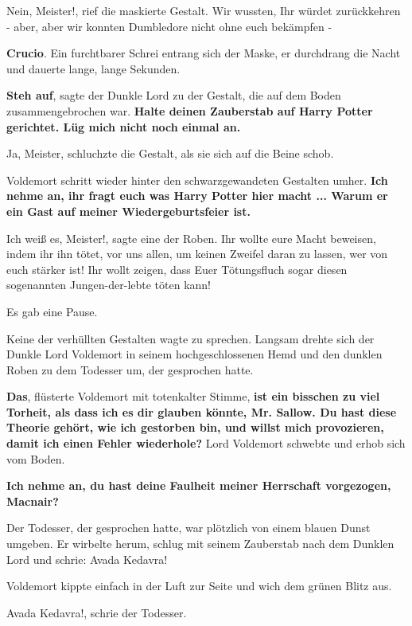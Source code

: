 \glqq{}Nein, Meister!\grqq{}, rief die maskierte Gestalt. \glqq{}Wir wussten, Ihr
würdet zurückkehren - aber, aber wir konnten Dumbledore nicht ohne euch
bekämpfen -\grqq{}

\glqq{}\textbf{Crucio}.\grqq{} Ein furchtbarer Schrei entrang sich der Maske, er
durchdrang die Nacht und dauerte lange, lange Sekunden.

\glqq{}\textbf{Steh auf}\grqq{}, sagte der Dunkle Lord zu der Gestalt, die auf
dem Boden zusammengebrochen war. \glqq{}\textbf{Halte deinen Zauberstab auf Harry
Potter gerichtet. Lüg mich nicht noch einmal an.}\grqq{}

\glqq{}Ja, Meister\grqq{}, schluchzte die Gestalt, als sie sich auf die Beine
schob.

Voldemort schritt wieder hinter den schwarzgewandeten Gestalten umher. \glqq{}
\textbf{Ich nehme an, ihr fragt euch was Harry Potter hier macht ... Warum er ein
Gast auf meiner Wiedergeburtsfeier ist.}\grqq{}

\glqq{}Ich weiß es, Meister!\grqq{}, sagte eine der Roben. \glqq{}Ihr wollte eure
Macht beweisen, indem ihr ihn tötet, vor uns allen, um keinen Zweifel daran zu
lassen, wer von euch stärker ist! Ihr wollt zeigen, dass Euer Tötungsfluch sogar
diesen sogenannten Jungen-der-lebte töten kann!\grqq{}

Es gab eine Pause.

Keine der verhüllten Gestalten wagte zu sprechen. Langsam drehte sich der Dunkle
Lord Voldemort in seinem hochgeschlossenen Hemd und den dunklen Roben zu dem
Todesser um, der gesprochen hatte.

\glqq{}\textbf{Das}\grqq{}, flüsterte Voldemort mit totenkalter Stimme, \glqq{}
\textbf{ist ein bisschen zu viel Torheit, als dass ich es dir glauben könnte,
Mr. Sallow. Du hast diese Theorie gehört, wie ich gestorben bin, und willst mich
provozieren, damit ich einen Fehler wiederhole?}\grqq{} Lord Voldemort schwebte und
erhob sich vom Boden.

\glqq{}\textbf{Ich nehme an, du hast deine Faulheit meiner Herrschaft vorgezogen,
Macnair?}\grqq{}

Der Todesser, der gesprochen hatte, war plötzlich von einem blauen Dunst
umgeben. Er wirbelte herum, schlug mit seinem Zauberstab nach dem Dunklen Lord
und schrie: \glqq{}Avada Kedavra!\grqq{}

Voldemort kippte einfach in der Luft zur Seite und wich dem grünen Blitz aus.

\glqq{}Avada Kedavra!\grqq{}, schrie der Todesser.

